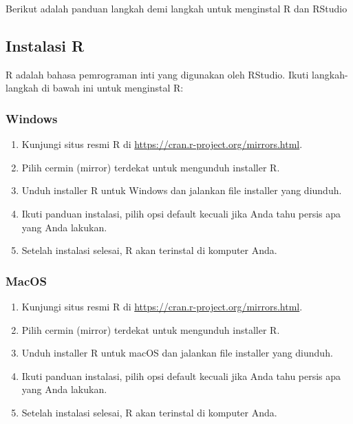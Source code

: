\documentclass[
]{book}
\providecommand{\tightlist}{%
  \setlength{\itemsep}{0pt}\setlength{\parskip}{0pt}}
\begin{document}
Berikut adalah panduan langkah demi langkah untuk menginstal R dan RStudio

\hypertarget{instalasi-r}{%
\subsection{Instalasi R}\label{instalasi-r}}

R adalah bahasa pemrograman inti yang digunakan oleh RStudio. Ikuti langkah-langkah di bawah ini untuk menginstal R:

\hypertarget{windows}{%
\subsubsection*{Windows}\label{windows}}

\begin{enumerate}
\def\labelenumi{\arabic{enumi}.}
\tightlist
\item
  Kunjungi situs resmi R di \url{https://cran.r-project.org/mirrors.html}.
\item
  Pilih cermin (mirror) terdekat untuk mengunduh installer R.
\item
  Unduh installer R untuk Windows dan jalankan file installer yang diunduh.
\item
  Ikuti panduan instalasi, pilih opsi default kecuali jika Anda tahu persis apa yang Anda lakukan.
\item
  Setelah instalasi selesai, R akan terinstal di komputer Anda.
\end{enumerate}

\hypertarget{macos}{%
\subsubsection*{MacOS}\label{macos}}

\begin{enumerate}
\def\labelenumi{\arabic{enumi}.}
\tightlist
\item
  Kunjungi situs resmi R di \url{https://cran.r-project.org/mirrors.html}.
\item
  Pilih cermin (mirror) terdekat untuk mengunduh installer R.
\item
  Unduh installer R untuk macOS dan jalankan file installer yang diunduh.
\item
  Ikuti panduan instalasi, pilih opsi default kecuali jika Anda tahu persis apa yang Anda lakukan.
\item
  Setelah instalasi selesai, R akan terinstal di komputer Anda.
\end{enumerate}
\end{document}
